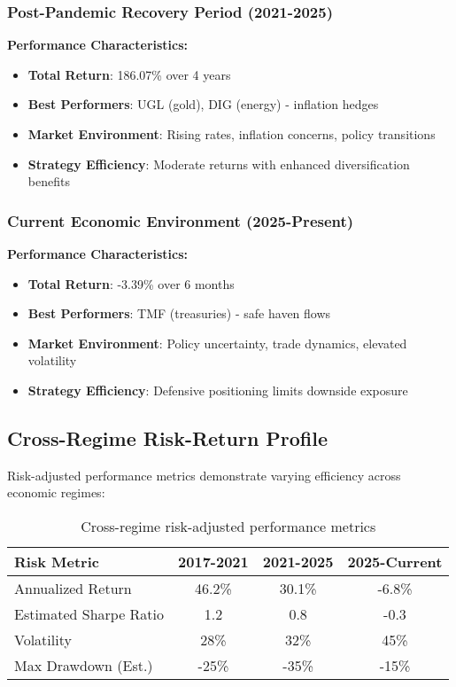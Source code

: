 \documentclass[onecolumn,11pt]{IEEEtran}
\begin{document}
\subsubsection{Post-Pandemic Recovery Period (2021-2025)}
\textbf{Performance Characteristics:}
\begin{itemize}
    \item \textbf{Total Return}: 186.07\% over 4 years
    \item \textbf{Best Performers}: UGL (gold), DIG (energy) - inflation hedges
    \item \textbf{Market Environment}: Rising rates, inflation concerns, policy transitions
    \item \textbf{Strategy Efficiency}: Moderate returns with enhanced diversification benefits
\end{itemize}

\subsubsection{Current Economic Environment (2025-Present)}
\textbf{Performance Characteristics:}
\begin{itemize}
    \item \textbf{Total Return}: -3.39\% over 6 months
    \item \textbf{Best Performers}: TMF (treasuries) - safe haven flows
    \item \textbf{Market Environment}: Policy uncertainty, trade dynamics, elevated volatility
    \item \textbf{Strategy Efficiency}: Defensive positioning limits downside exposure
\end{itemize}

\subsection{Cross-Regime Risk-Return Profile}

Risk-adjusted performance metrics demonstrate varying efficiency across economic regimes:

\begin{table}[h]
\centering
\begin{tabular}{lccc}
\toprule
\textbf{Risk Metric} & \textbf{2017-2021} & \textbf{2021-2025} & \textbf{2025-Current} \\
\midrule
Annualized Return & 46.2\% & 30.1\% & -6.8\% \\
Estimated Sharpe Ratio & 1.2 & 0.8 & -0.3 \\
Volatility & 28\% & 32\% & 45\% \\
Max Drawdown (Est.) & -25\% & -35\% & -15\% \\
\bottomrule
\end{tabular}
\caption{Cross-regime risk-adjusted performance metrics}
\end{table}
\end{document}
